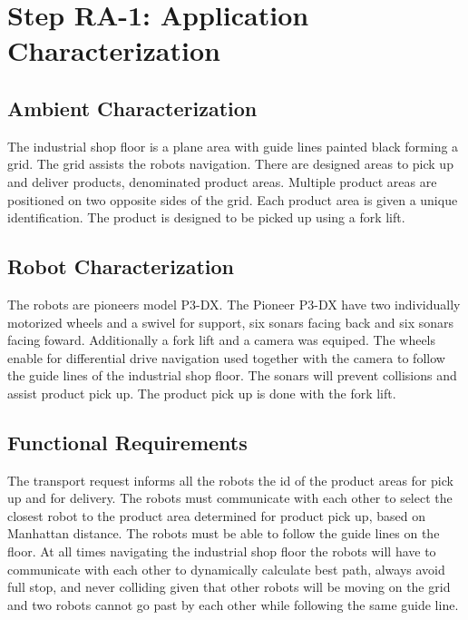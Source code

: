 \section{Step RA-1: Application Characterization}

\subsection{Ambient Characterization}
The industrial shop floor is a plane area with guide lines painted black forming a grid. The grid assists the robots navigation. There are designed areas to pick up and deliver products, denominated product areas. Multiple product areas are positioned on two opposite sides of the grid. Each product area is given a unique identification. The product is designed to be picked up using a fork lift.

\subsection{Robot Characterization}
The robots are pioneers model P3-DX. The Pioneer P3-DX have two individually motorized wheels and a swivel for support, six sonars facing back and six sonars facing foward. Additionally a fork lift and a camera was equiped. The wheels enable for differential drive navigation used together with the camera to follow the guide lines of the industrial shop floor. The sonars will prevent collisions and assist product pick up. The product pick up is done with the fork lift.

\subsection{Functional Requirements}
The transport request informs all the robots the id of the product areas for pick up and for delivery. The robots must communicate with each other to select the closest robot to the product area determined for product pick up, based on Manhattan distance.
The robots must be able to follow the guide lines on the floor. At all times navigating the industrial shop floor the robots will have to communicate with each other to dynamically calculate best path, always avoid full stop, and never colliding given that other robots will be moving on the grid and two robots cannot go past by each other while following the same guide line.

